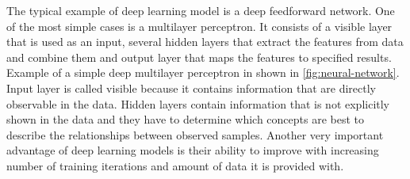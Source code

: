 The typical example of deep learning model is a deep feedforward network. One of the most simple cases is a multilayer perceptron. It consists of a visible layer that is used as an input, several hidden layers that extract the features from data and combine them and output layer that maps the features to specified results. Example of a simple deep multilayer perceptron in shown in \autoref{fig:neural-network}. Input layer is called visible because it contains information that are directly observable in the data. Hidden layers contain information that is not explicitly shown in the data and they have to determine which concepts are best to describe the relationships between observed samples. Another very important advantage of deep learning models is their ability to improve with increasing number of training iterations and amount of data it is provided with.

